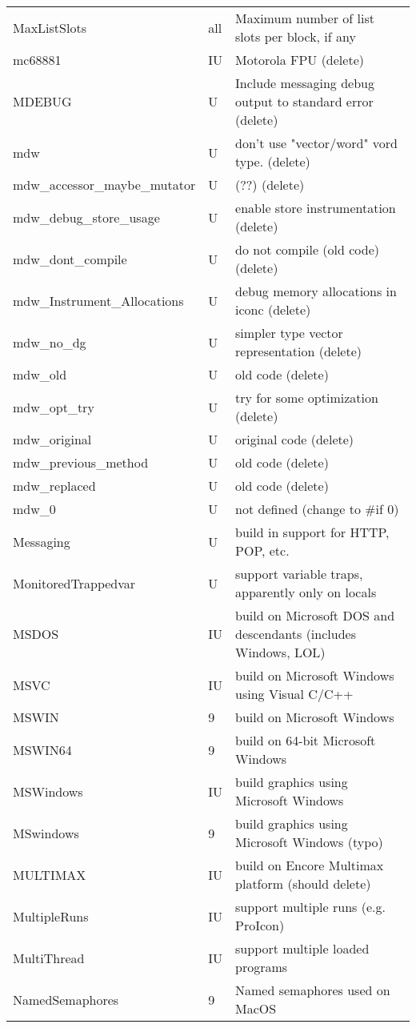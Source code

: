 \begin{xtabular}{|m{1.8in}|m{0.5in}|m{4.0in}|}
MaxListSlots & all & Maximum number of list slots per block, if any \\
mc68881 & IU & Motorola FPU (delete) \\
MDEBUG & U & Include messaging debug output to standard error (delete) \\
mdw & U & don't use "vector/word" vord type. (delete) \\
mdw\_accessor\_maybe\_mutator & U & (??) (delete) \\
mdw\_debug\_store\_usage & U & enable store instrumentation (delete) \\
mdw\_dont\_compile & U & do not compile (old code) (delete) \\
mdw\_Instrument\_Allocations & U & debug memory allocations in iconc (delete) \\
mdw\_no\_dg & U & simpler type vector representation (delete) \\
mdw\_old & U & old code (delete) \\
mdw\_opt\_try & U & try for some optimization (delete) \\
mdw\_original & U & original code (delete) \\
mdw\_previous\_method & U & old code (delete) \\
mdw\_replaced & U & old code (delete) \\
mdw\_0 & U & not defined (change to \#if 0) \\
Messaging & U & build in support for HTTP, POP, etc. \\
MonitoredTrappedvar & U & support variable traps, apparently only on locals \\
MSDOS & IU & build on Microsoft DOS and descendants (includes Windows, LOL) \\
MSVC & IU & build on Microsoft Windows using Visual C/C++ \\
MSWIN & 9 & build on Microsoft Windows \\
MSWIN64 & 9 & build on 64-bit Microsoft Windows \\
MSWindows & IU & build graphics using Microsoft Windows \\
MSwindows & 9 & build graphics using Microsoft Windows (typo) \\
MULTIMAX & IU & build on Encore Multimax platform (should delete) \\
MultipleRuns & IU & support multiple runs (e.g. ProIcon) \\
MultiThread & IU & support multiple loaded programs \\
NamedSemaphores & 9 & Named semaphores used on MacOS \\

\end{xtabular}
